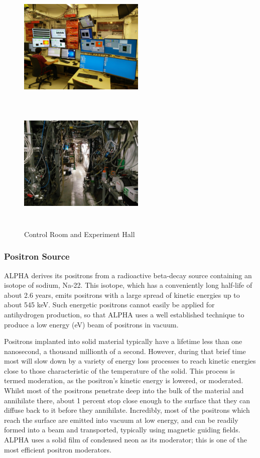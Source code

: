 \documentclass[12pt,a4paper]{article}
\begin{document}
\begin{figure}[h]
\centering
\includegraphics[width=60mm, height=60mm]{control_room}
\includegraphics[width=60mm, height=60mm]{experiment_hall}
\caption{Control Room and Experiment Hall}
\label{control}
\end{figure}




\subsubsection{Positron Source}

ALPHA derives its positrons from a radioactive beta-decay source containing an isotope of sodium, Na-22. This isotope, which has a conveniently long half-life of about 2.6 years, emits positrons with a large spread of kinetic energies up to about 545 keV. Such energetic positrons cannot easily be applied for antihydrogen production, so that ALPHA uses a well established technique to produce a low energy (eV) beam of positrons in vacuum.

Positrons implanted into solid material typically have a lifetime less than one nanosecond, a thousand millionth of a second. However, during that brief time most will slow down by a variety of energy loss processes to reach kinetic energies close to those characteristic of the temperature of the solid. This process is termed moderation, as the positron’s kinetic energy is lowered, or moderated. Whilst most of the positrons penetrate deep into the bulk of the material and annihilate there, about 1 percent
 stop close enough to the surface that they can diffuse back to it before they annihilate. Incredibly, most of the positrons which reach the surface are emitted into vacuum at low energy, and can be readily formed into a beam and transported, typically using magnetic guiding fields. ALPHA uses a solid film of condensed neon as its moderator; this is one of the most efficient positron moderators.
 
\end{document}
